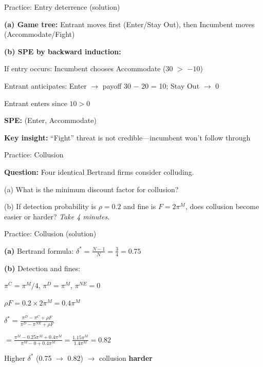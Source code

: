 \documentclass[notes,11pt, aspectratio=169]{beamer}
\newenvironment{wideitemize}{\itemize\addtolength{\itemsep}{10pt}}{\enditemize}
\begin{document}
\begin{frame}{Practice: Entry deterrence (solution)}
	\begin{wideitemize}
		\item \textbf{(a) Game tree:} Entrant moves first (Enter/Stay Out), then Incumbent moves (Accommodate/Fight)
		\item \textbf{(b) SPE by backward induction:}
		\begin{wideitemize}
			\vspace{3pt}
			\item If entry occurs: Incumbent chooses Accommodate (30 $>$ $-10$)
			\item Entrant anticipates: Enter $\rightarrow$ payoff 30 $-$ 20 = 10; Stay Out $\rightarrow$ 0
			\item Entrant enters since $10 > 0$
		\end{wideitemize}
		\item \textbf{SPE:} (Enter, Accommodate)
		\item \textbf{Key insight:} ``Fight'' threat is not credible---incumbent won't follow through
	\end{wideitemize}
\end{frame}

\begin{frame}{Practice: Collusion}
	\begin{wideitemize}
		\item \textbf{Question:} Four identical Bertrand firms consider colluding.
		\item (a) What is the minimum discount factor for collusion?
		\item (b) If detection probability is $\rho = 0.2$ and fine is $F = 2\pi^M$, does collusion become easier or harder?
	\end{wideitemize}
	\vspace{10pt}
	\centering
	\textit{Take 4 minutes.}
\end{frame}

\begin{frame}{Practice: Collusion (solution)}
	\begin{wideitemize}
		\item \textbf{(a)} Bertrand formula: $\delta^* = \frac{N-1}{N} = \frac{3}{4} = 0.75$
		\item \textbf{(b)} Detection and fines:
		\begin{wideitemize}
			\vspace{3pt}
			\item $\pi^C = \pi^M/4$, $\pi^D = \pi^M$, $\pi^{NE} = 0$
			\item $\rho F = 0.2 \times 2\pi^M = 0.4\pi^M$
			\item $\delta^* = \frac{\pi^D - \pi^C + \rho F}{\pi^D - \pi^{NE} + \rho F}$
			\item $= \frac{\pi^M - 0.25\pi^M + 0.4\pi^M}{\pi^M - 0 + 0.4\pi^M} = \frac{1.15\pi^M}{1.4\pi^M} = 0.82$
		\end{wideitemize}
		\item Higher $\delta^*$ (0.75 $\rightarrow$ 0.82) $\rightarrow$ collusion \textbf{harder}
	\end{wideitemize}
\end{frame}
\end{document}
